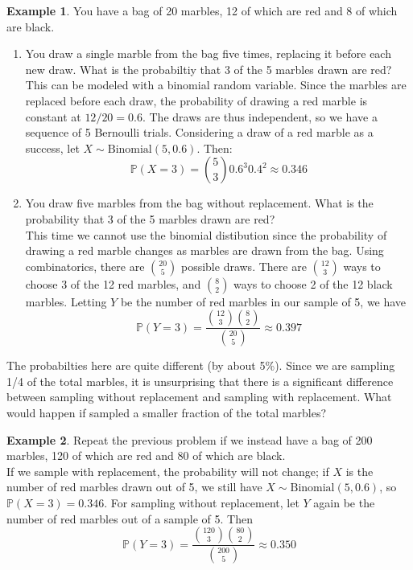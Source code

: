 \documentclass[12pt]{article}
\theoremstyle{definition}
\newtheorem*{example}{Example}
\theoremstyle{remark}
\def\P{{\mathbb P}}
\begin{document}
\begin{example}You have a bag of 20 marbles, 12 of which are red and 8 of which are black.
\begin{enumerate}
\item You draw a single marble from the bag five times, replacing it before each new draw. What is the probabiltiy that 3 of the 5 marbles drawn are red?\\

This can be modeled with a binomial random variable. Since the marbles are replaced before each draw, the probability of drawing a red marble is constant at $12/20 = 0.6$. The draws are thus independent, so we have a sequence of 5 Bernoulli trials. Considering a draw of a red marble as a success, let $X\sim\text{Binomial}(5, 0.6)$. Then:
\[
\P(X = 3) = \binom{5}{3} 0.6^3 0.4^2 \approx 0.346
\]

\item You draw five marbles from the bag without replacement. What is the probability that 3 of the 5 marbles drawn are red?\\

This time we cannot use the binomial distibution since the probability of drawing a red marble changes as marbles are drawn from the bag. Using combinatorics, there are $\binom{20}{5}$ possible draws. There are $\binom{12}{3}$ ways to choose 3 of the 12 red marbles, and $\binom{8}{2}$ ways to choose 2 of the 12 black marbles. Letting $Y$ be the number of red marbles in our sample of 5, we have
\[
\P(Y = 3) = \frac{ \binom{12}{3}\binom{8}{2}}{\binom{20}{5}} \approx 0.397
\]
\end{enumerate}
\end{example}

The probabilties here are quite different (by about 5\%). Since we are sampling 1/4 of the total marbles, it is unsurprising that there is a significant difference between sampling without replacement and sampling with replacement. What would happen if sampled a smaller fraction of the total marbles?

\begin{example}Repeat the previous problem if we instead have a bag of 200 marbles, 120 of which are red and 80 of which are black.\\

If we sample with replacement, the probability will not change; if $X$ is the number of red marbles drawn out of 5, we still have $X \sim \text{Binomial}(5, 0.6)$, so $\P(X = 3) = 0.346$. For sampling without replacement, let $Y$ again be the number of red marbles out of a sample of 5. Then
\[
\P(Y = 3) = \frac{ \binom{120}{3}\binom{80}{2}}{\binom{200}{5}} \approx 0.350
\]
\end{example}
\end{document}

